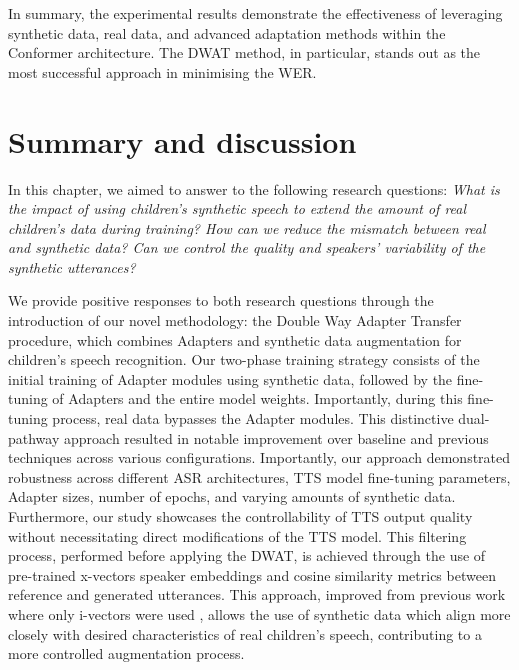 In summary, the experimental results demonstrate the effectiveness of leveraging synthetic data, real data, and advanced adaptation methods within the Conformer architecture. The \ac{DWAT} method, in particular, stands out as the most successful approach in minimising the \ac{WER}.


\section{Summary and discussion}
\label{section:conclusions_TTS}

In this chapter, we aimed to answer to the following research questions: \textit{What is the impact of using children's synthetic speech to extend the amount of real children's data during training? How can we reduce the mismatch between real and synthetic data? Can we control the quality and speakers’ variability of the synthetic utterances?}

We provide positive responses to both research questions through the introduction of our novel methodology: the Double Way Adapter Transfer procedure, which combines Adapters and synthetic data augmentation for children's speech recognition. Our two-phase training strategy consists of the initial training of Adapter modules using synthetic data, followed by the fine-tuning of Adapters and the entire model weights. Importantly, during this fine-tuning process, real data bypasses the Adapter modules. This distinctive dual-pathway approach resulted in notable improvement over baseline and previous techniques across various configurations. Importantly, our approach demonstrated robustness across different \ac{ASR} architectures, \ac{TTS} model fine-tuning parameters, Adapter sizes, number of epochs, and varying amounts of synthetic data. Furthermore, our study showcases the controllability of \ac{TTS} output quality without necessitating direct modifications of the \ac{TTS} model. This filtering process, performed before applying the \ac{DWAT}, is achieved through the use of pre-trained x-vectors speaker embeddings and cosine similarity metrics between reference and generated utterances. This approach, improved from previous work where only i-vectors were used \cite{wang2021towards}, allows the use of synthetic data which align more closely with desired characteristics of real children's speech, contributing to a more controlled augmentation process.

